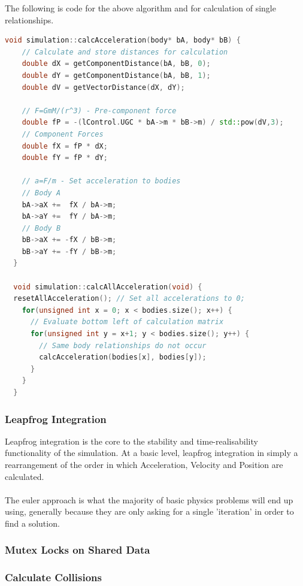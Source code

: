 \pagebreak

The following is code for the above algorithm and for calculation of single relationships.
\begin{lstlisting}[language=c++]
  void simulation::calcAcceleration(body* bA, body* bB) {
    // Calculate and store distances for calculation
    double dX = getComponentDistance(bA, bB, 0);
    double dY = getComponentDistance(bA, bB, 1);
    double dV = getVectorDistance(dX, dY);

    // F=GmM/(r^3) - Pre-component force
    double fP = -(lControl.UGC * bA->m * bB->m) / std::pow(dV,3);
    // Component Forces
    double fX = fP * dX;
    double fY = fP * dY;

    // a=F/m - Set acceleration to bodies
    // Body A
    bA->aX +=  fX / bA->m;
    bA->aY +=  fY / bA->m;
    // Body B
    bB->aX += -fX / bB->m;
    bB->aY += -fY / bB->m;
  }   
  
  void simulation::calcAllAcceleration(void) {
  resetAllAcceleration(); // Set all accelerations to 0;
    for(unsigned int x = 0; x < bodies.size(); x++) {
      // Evaluate bottom left of calculation matrix
      for(unsigned int y = x+1; y < bodies.size(); y++) {
        // Same body relationships do not occur
        calcAcceleration(bodies[x], bodies[y]);
      }
    } 
  }
\end{lstlisting}

\subsubsection{Leapfrog Integration}
Leapfrog integration is the core to the stability and time-realisability functionality of the simulation. At a basic level, leapfrog integration in simply a rearrangement of the order in which Acceleration, Velocity and Position are calculated.

\paragraph{}
The euler approach is what the majority of basic physics problems will end up using, generally because they are only asking for a single 'iteration' in order to find a solution.

\subsubsection{Mutex Locks on Shared Data}

\subsubsection{Calculate Collisions}

